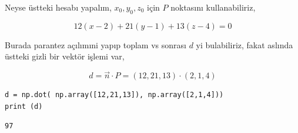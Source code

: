 \documentclass[12pt,fleqn]{article}\usepackage{../../common}
\begin{document}
Neyse üstteki hesabı yapalım, $x_0,y_0,z_0$ için $P$ noktasını kullanabiliriz,

$$
12(x-2) + 21(y-1) + 13(z-4) = 0
$$

Burada parantez açılımıni yapıp toplam vs sonrası $d$ yi bulabiliriz, fakat
aslında üstteki gizli bir vektör işlemi var,

$$
d = \vec{n} \cdot P = (12,21,13) \cdot (2,1,4)
$$

\begin{verbatim}
d = np.dot( np.array([12,21,13]), np.array([2,1,4]))
print (d)
\end{verbatim}

\begin{verbatim}
97
\end{verbatim}
\end{document}

